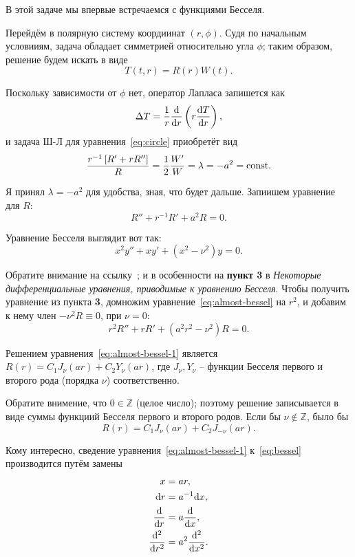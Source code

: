 \documentclass[12pt]{report}
\begin{document}
В этой задаче мы впервые встречаемся с функциями Бесселя.

Перейдём в полярную систему коордиинат $(r,\phi)$. Судя по начальным условииям, задача обладает симметрией относительно угла $\phi$; таким образом, решение будем искать в виде 
\[
T(t,r) = R(r)W(t).
\]

Поскольку зависимости от $\phi$ нет, оператор Лапласа запишется как 
\[
\Delta T = \frac{1}{r}\frac{\mathrm d }{\mathrm d r}\left(r \frac{\mathrm d T}{\mathrm d r}\right),
\]
и задача Ш-Л для уравнения~\eqref{eq:circle} приобретёт вид
\begin{align*}
	\frac{r^{-1}\left[R' + rR''\right]}{R} = \frac12\frac{W'}{W} = \lambda = -a^2 = \mathrm{const}.
\end{align*}

Я принял $\lambda = -a^2$ для удобства, зная, что будет дальше. Запиишем уравнение для $R$:
\begin{equation}\label{eq:almost-bessel}
R'' + r^{-1}R' + a^2R = 0.
\end{equation}

Уравнение Бесселя выглядит вот так:~\cite[стр.~625]{TS:special-funcs}
\begin{equation}\label{eq:bessel}
	x^2y'' + xy' + (x^2 - \nu^2)y=0.
\end{equation}

Обратите внимание на ссылку~\cite{bessel-funcs}; и в особенности на \textbf{пункт 3} в \emph{Некоторые дифференциальные уравнения, приводимые к уравнению Бесселя}. Чтобы получить уравнение из пункта \textbf{3}, домножим уравнение~\eqref{eq:almost-bessel} на $r^2$, и добавим к нему член $-\nu^2R \equiv 0$, при $\nu=0$:
\begin{equation}\label{eq:almost-bessel-1}
	r^2R'' + rR' + (a^2r^2-\nu^2)R = 0.
\end{equation}

Решением уравнения~\eqref{eq:almost-bessel-1} является $R(r) = C_1J_\nu(ar) + C_2Y_\nu(ar)$, где $J_\nu, Y_\nu$ -- функции Бесселя первого и второго рода (порядка $\nu$) соответственно.

\begin{rmk}
	Обратите внимение, что $0\in\mathbb{Z}$ (целое число); поэтому решение записывается в виде суммы функциий Бесселя первого и второго родов. Если бы $\nu\notin\mathbb{Z}$, было бы
	\[
	R(r) = C_1J_\nu(ar) + C_2J_{-\nu}(ar).
	\]
\end{rmk}

\begin{rmk}
	Кому интересно, сведение уравнения~\eqref{eq:almost-bessel-1} к~\eqref{eq:bessel} производится путём замены
	\begin{align*}
		x &= ar, \\
		\mathrm d r &= a^{-1}\mathrm d x, \\
		\frac{\mathrm d}{\mathrm d r} &= a\frac{\mathrm d}{\mathrm d x},\\
		\frac{\mathrm d^2}{\mathrm d r^2}&= a^2\frac{\mathrm d^2}{\mathrm d x^2}.
	\end{align*}
\end{rmk}
\end{document}
